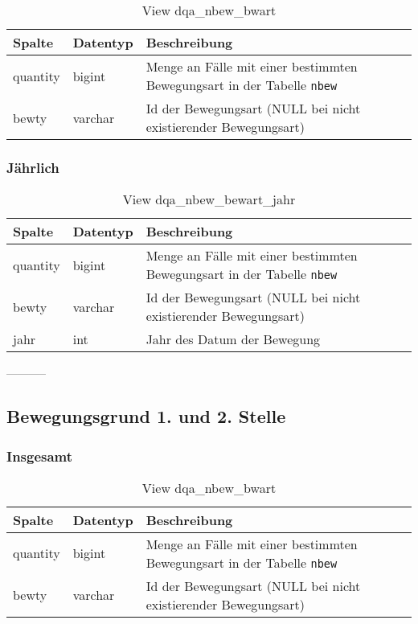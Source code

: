 \begin{table}[ht]
	\centering   
	\caption{View dqa\_nbew\_bwart}
	\label{tab:bewArtI}
	\begin{tabular}{||l|l|p{10cm}||}   		
		\hline
		Spalte & Datentyp & Beschreibung \\ [0.5ex]
		\hline\hline
		quantity & bigint & Menge an Fälle mit einer bestimmten Bewegungsart in der Tabelle \texttt{nbew} \\
		\hline
		bewty & varchar & Id der Bewegungsart (NULL bei nicht existierender Bewegungsart)\\
		\hline
		
	\end{tabular}
\end{table}

\newpage

\subsubsection{Jährlich} \label{subsubsec:bewartJ}

\begin{table}[ht]
	\centering   
	\caption{View dqa\_nbew\_bewart\_jahr}
	\label{tab:bewArtJ}
	\begin{tabular}{||l|l|p{10cm}||}   		
		\hline
		Spalte & Datentyp & Beschreibung \\ [0.5ex]
		\hline\hline
		quantity & bigint & Menge an Fälle mit einer bestimmten Bewegungsart in der Tabelle \texttt{nbew}\\
		\hline
		bewty & varchar & Id der Bewegungsart (NULL bei nicht existierender Bewegungsart)\\
		\hline
		jahr & int &  Jahr des Datum der Bewegung \\
		\hline		
	\end{tabular}
\end{table}

-----------
\subsection{Bewegungsgrund 1. und 2. Stelle} \label{subsec:bewart}

\subsubsection{Insgesamt} \label{subsubsec:bewg1I}

\begin{table}[ht]
	\centering   
	\caption{View dqa\_nbew\_bwart}
	\label{tab:bewG1I}
	\begin{tabular}{||l|l|p{10cm}||}   		
		\hline
		Spalte & Datentyp & Beschreibung \\ [0.5ex]
		\hline\hline
		quantity & bigint & Menge an Fälle mit einer bestimmten Bewegungsart in der Tabelle \texttt{nbew} \\
		\hline
		bewty & varchar & Id der Bewegungsart (NULL bei nicht existierender Bewegungsart)\\
		\hline
		
	\end{tabular}
\end{table}

